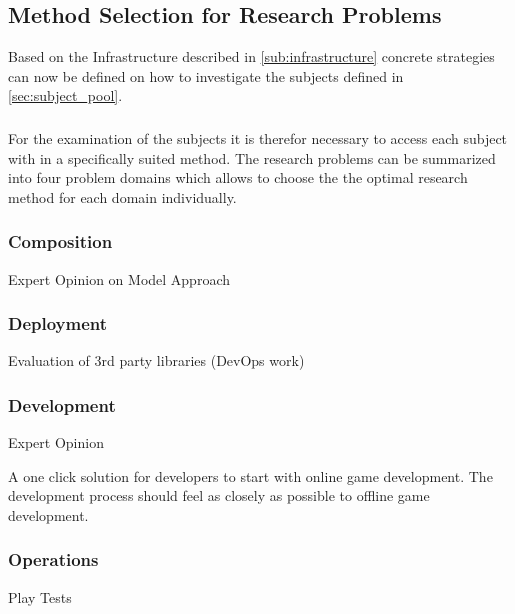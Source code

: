 \subsection{Method Selection for Research Problems}

Based on the Infrastructure described in \autoref{sub:infrastructure} concrete
strategies can now be defined on how to investigate the subjects defined in
\autoref{sec:subject_pool}.

\subsubsection{}

For the examination of the subjects it is therefor necessary to access each
subject with in a specifically suited method. The research problems can be
summarized into four problem domains which allows to choose the the optimal
research method for each domain individually.

\subsubsection{Composition}
Expert Opinion on Model Approach

\subsubsection{Deployment}
Evaluation of 3rd party libraries (DevOps work)


\subsubsection{Development}
Expert Opinion

A one click solution for developers to start with online game
  	  development. The development process should feel as closely as possible to
  	  offline game development.

\subsubsection{Operations}
Play Tests






